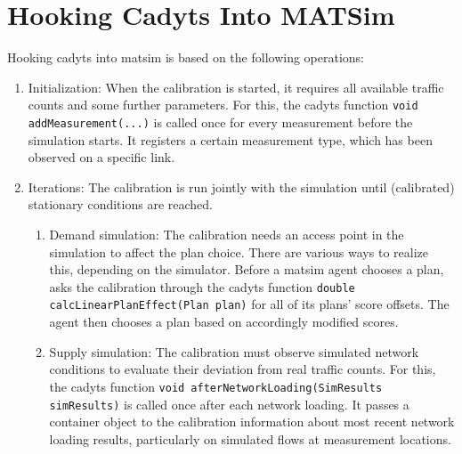 \section{Hooking Cadyts Into MATSim}
Hooking \gls{cadyts} into \gls{matsim} is based on the following operations:
\begin{enumerate}\styleEnumerate
\item Initialization: When the calibration is started, it requires all available 
traffic counts and some further parameters. 
For this, the \gls{cadyts} function \lstinline|void addMeasurement(...)| is called once for every 
measurement\corr{,}{} before the simulation starts. It registers a certain
measurement type, which has been observed on a specific link.
\item Iterations: The calibration is run jointly with the simulation until (calibrated) 
stationary conditions are reached.
	\begin{enumerate}[label=\emph{\alph*})]
	\item Demand simulation: The calibration needs an access point in the simulation 
	to affect the plan choice. There are various ways to realize this, depending on the  
	simulator.	
	Before a \gls{matsim} agent chooses a plan,  asks the
	calibration through the \gls{cadyts} function
	\lstinline|double calcLinearPlanEffect(Plan plan)| for all of its plans' score offsets.
    The agent then chooses a plan based on accordingly modified scores.
	\item Supply simulation: The calibration must observe simulated network conditions 
  to evaluate their deviation from real traffic counts.
	For this, the \gls{cadyts} function \lstinline|void afterNetworkLoading(SimResults simResults)| 
	is called once after each network loading. It passes a container object to the calibration
	 information about  most recent
	network loading results, particularly on simulated flows at measurement locations.
	\end{enumerate}
\end{enumerate}

